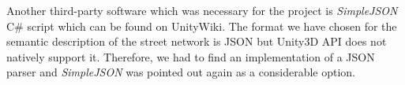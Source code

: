 Another third-party software which was necessary for the project is \emph{SimpleJSON} C\# script which can be found on UnityWiki. The format we have chosen for the semantic description of the street network is JSON but Unity3D API does not natively support it. Therefore, we had to find an implementation of a JSON parser and \emph{SimpleJSON} was pointed out again as a considerable option.
